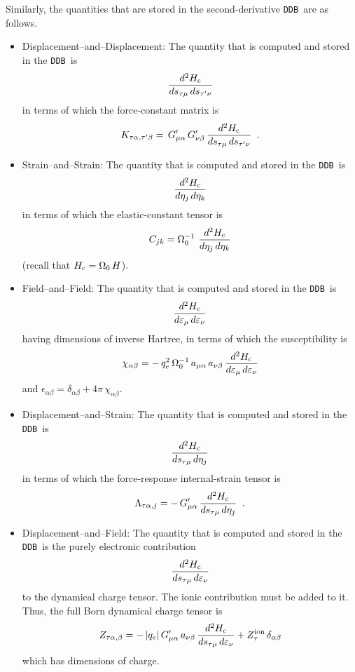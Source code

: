 \documentclass[11pt,fleqn]{article}
\def\beq{\begin{equation}}
\def\eeq{\end{equation}}
\def\eps{\epsilon}
\def\Oo{\Omega_0}
\def\bc{_{\rm c}}
\def\veps{\varepsilon}
\def\DDB{{\tt DDB}}
\begin{document}
Similarly, the quantities that are stored in the second-derivative
\DDB\ are as follows.
%
\begin{itemize}

\item Displacement--and--Displacement:
%
The quantity that is computed and stored in the \DDB\ is
%
\beq
{d^2H\bc\over ds_{\tau\mu}\,ds_{\tau'\nu}}
\eeq
%
in terms of which the force-constant matrix is
%
\beq
K_{\tau\alpha,\tau'\beta}=\,G'_{\mu\alpha}\,G'_{\nu\beta}\,
{d^2H\bc \over ds_{\tau\mu}\,ds_{\tau'\nu}}
\;\;.
\eeq
%

\item Strain--and--Strain:
%
The quantity that is computed and stored in the \DDB\ is
%
\beq
{d^2 H\bc \over d\eta_j\,d\eta_k}
\eeq
%
in terms of which the elastic-constant tensor is
%
\beq
C_{jk}= \Oo^{-1}\,\,{d^2 H\bc \over d\eta_j\,d\eta_k}
\eeq
%
(recall that $H\bc=\Oo\,H$).

\item Field--and--Field:
%
The quantity that is computed and stored in the \DDB\ is
%
\beq
{d^2H\bc \over d\veps_\mu\,d\veps_\nu}
\eeq
%
having dimensions of inverse Hartree,
in terms of which the susceptibility is
%
\beq
\chi_{\alpha\beta}=-\,q_e^2\, \Oo^{-1}\, a_{\mu\alpha}\,a_{\nu\beta}\,
   {d^2H\bc \over d\veps_\mu\,d\veps_\nu}
\eeq
%
and $\eps_{\alpha\beta}=\delta_{\alpha\beta}+4\pi\,\chi_{\alpha\beta}$.


\item Displacement--and--Strain:
%
The quantity that is computed and stored in the \DDB\ is
%
\beq
{d^2H\bc \over ds_{\tau\mu}\,d\eta_j}
\eeq
%
in terms of which the force-response internal-strain tensor is
%
\beq
\Lambda_{\tau\alpha,j}= -\,G'_{\mu\alpha}\,
{d^2H\bc \over ds_{\tau\mu}\,d\eta_j}
\;\;.
\eeq
%

\item Displacement--and--Field:
%
The quantity that is computed and stored in the \DDB\ is
the purely electronic contribution
%
\beq
{d^2H\bc \over ds_{\tau\mu}\,d\veps_\nu}
\eeq
%
to the dynamical charge tensor.  The ionic contribution must be
added to it.  Thus, the full Born dynamical charge tensor is
%
\beq
Z_{\tau\alpha,\beta}=-\,|q_e|\,G'_{\mu\alpha}\,a_{\nu\beta}\,
{d^2H\bc \over ds_{\tau\mu}\,d\veps_\nu}
+ Z^{\rm ion}_\tau\,\delta_{\alpha\beta}
\eeq
%
which has dimensions of charge.


\end{itemize}
\end{document}
